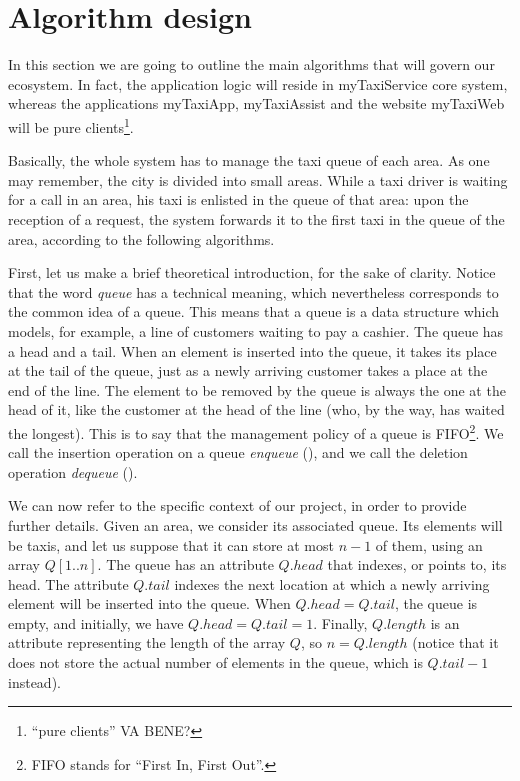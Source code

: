 \chapter{Algorithm design}


In this section we are going to outline the main algorithms that will govern our ecosystem. In fact, the application logic will reside in myTaxiService core system, whereas the applications myTaxiApp, myTaxiAssist and the website myTaxiWeb will be pure clients\footnote{``pure clients'' VA BENE?}. %

Basically, the whole system has to manage the taxi queue of each area. As one may remember, the city is divided into small areas. While a taxi driver is waiting for a call in an area, his taxi is enlisted in the queue of that area: upon the reception of a request, the system forwards it to the first taxi in the queue of the area, according to the following algorithms.

First, let us make a brief theoretical introduction, for the sake of clarity. Notice that the word \emph{queue} has a technical meaning, which nevertheless corresponds to the common idea of a queue. This means that a queue is a data structure which models, for example, a line of customers waiting to pay a cashier. The queue has a head and a tail. When an element is inserted into the queue, it takes its place at the tail of the queue, just as a newly arriving customer takes a place at the end of the line. The element to be removed by the queue is always the one at the head of it, like the customer at the head of the line (who, by the way, has waited the longest). This is to say that the management policy of a queue is FIFO\footnote{FIFO stands for ``First In, First Out''.}. We call the insertion operation on a queue \emph{enqueue} (), and we call the deletion operation \emph{dequeue} (). 

We can now refer to the specific context of our project, in order to provide further details. Given an area, we consider its associated queue. Its elements will be taxis, and let us suppose that it can store at most $n-1$ of them, using an array $Q\left[1..n\right]$. The queue has an attribute $Q.head$ that indexes, or points to, its head. The attribute $Q.tail$ indexes the next location at which a newly arriving element will be inserted into the queue. When $Q.head = Q.tail$, the queue is empty, and initially, we have $Q.head = Q.tail = 1$. Finally, $Q.length$ is an attribute representing the length of the array $Q$, so $n = Q.length$ (notice that it does not store the actual number of elements in the queue, which is $Q.tail-1$ instead).

